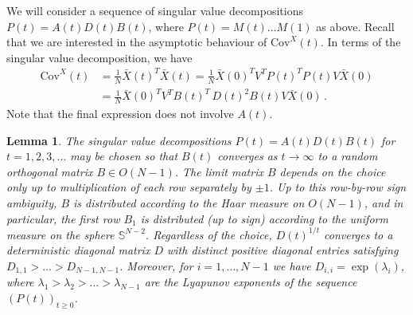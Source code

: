 \documentclass[12pt]{article}
\newtheorem{lemma}{Lemma}
\newcommand{\Cov}{\mathrm{Cov}}
\newcommand{\1}{\mathbf{1}}
\begin{document}
We will consider a sequence of singular value decompositions $P(t) = A(t)D(t)B(t)$, where $P(t) = M(t) \dots M(1)$ as above. Recall that we are interested in the asymptotic behaviour of $\Cov^X(t)$. In terms of the singular value decomposition, we have
\begin{equation} \label{E: Cov in terms of SVD}
\begin{split}
\Cov^X(t) &= \frac{1}{N} \bar X(t)^T \bar X(t) = \frac{1}{N} \bar X(0)^T V^T P(t)^T P(t) V \bar X(0)  \\ &= \frac{1}{N} \bar X(0)^T V^T B(t)^T\,D(t)^2B(t) V \bar X(0) \,.
\end{split}
\end{equation}
Note that the final expression does not involve $A(t)$. 

\begin{lemma}\label{L: GuivarchRaugi}
The singular value decompositions $P(t) = A(t) D(t) B(t)$ for $t = 1,2,3, \dots$ may be chosen so that $B(t)$ converges as $t \to \infty$ to a random orthogonal matrix $B \in O(N-1)$. The limit matrix $B$ depends on the choice only up to multiplication of each row separately by $\pm 1$. Up to this row-by-row sign ambiguity, $B$ is distributed according to the Haar measure on $O(N-1)$, and in particular, the first row $B_1$ is distributed (up to sign) according to the uniform measure on the sphere $\mathbb{S}^{N-2}$. Regardless of the choice, $D(t)^{1/t}$ converges to a deterministic diagonal matrix $D$ with distinct positive diagonal entries satisfying $D_{1,1} > \dots > D_{N-1,N-1}$.  Moreover, for $i=1, \dots, N-1$ we have $D_{i,i} = \exp(\lambda_i)$, where $\lambda_1 > \lambda_2 > \dots > \lambda_{N-1}$ are the Lyapunov exponents of the sequence $(P(t))_{t \ge 0}$. 
\end{lemma}
\end{document}
